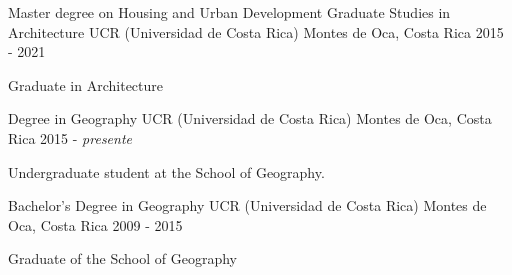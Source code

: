 

\begin{cventries}
  \cventry
  {Master degree on Housing and Urban Development Graduate Studies in Architecture} %
  {UCR (Universidad de Costa Rica)} %
  {Montes de Oca, Costa Rica} %
  {2015 - 2021} %
  {
    \begin{cvitems} %
      \item {Graduate in Architecture}
    \end{cvitems}
  }

  \cventry
  {Degree in Geography} %
  {UCR (Universidad de Costa Rica)} %
  {Montes de Oca, Costa Rica} %
  {2015 - \textit{presente}} %
  {
    \begin{cvitems} %
      \item {Undergraduate student at the School of Geography.}
    \end{cvitems}
  }

  \cventry
    {Bachelor's Degree in Geography} %
    {UCR (Universidad de Costa Rica)} %
    {Montes de Oca, Costa Rica} %
    {2009 - 2015} %
    {
      \begin{cvitems} %
        \item {Graduate of the School of Geography}
      \end{cvitems}
    }

\end{cventries}
